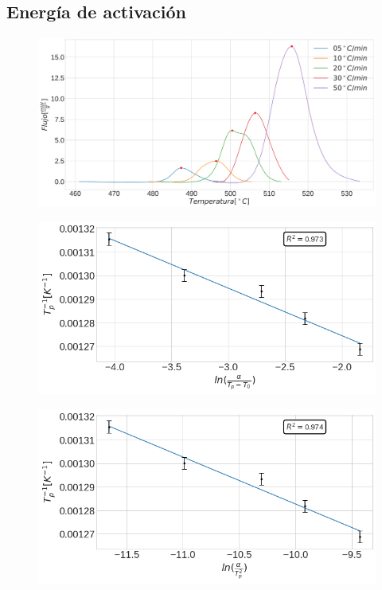 \documentclass[11pt]{beamer}
\begin{document}
	\subsection{Energía de activación}
	\begin{frame}
		\begin{figure}
			\includegraphics[scale=0.1]{img/DSCPeaks.png}
		\end{figure}
		\begin{figure}
			\includegraphics[scale=0.1]{img/Augis_bennet.png}
		\end{figure}
		\begin{figure}
			\includegraphics[scale=0.1]{img/Kissinger.png}
		\end{figure}
	\end{frame}
\end{document}
